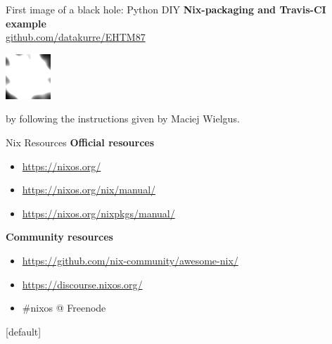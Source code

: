 \documentclass[12pt,aspectratio=169]{beamer}
\begin{document}

\begin{frame}[fragile]{First image of a black hole: Python DIY }
\textbf{Nix-packaging and Travis-CI example}\\
\href{https://github.com/datakurre/EHTM87/}{github.com/datakurre/EHTM87}
\par
\includegraphics[width=0.20\paperwidth]{images/M87.png}
\par
by following the instructions given by Maciej Wielgus.
\end{frame}


\begin{frame}{Nix Resources}
  \textbf{Official resources}
  \begin{itemize}
    \item \href{https://nixos.org/}{https://nixos.org/}
    \item \href{https://nixos.org/nix/manual/}{https://nixos.org/nix/manual/}
    \item \href{https://nixos.org/nixpkgs/manual/}{https://nixos.org/nixpkgs/manual/}
  \end{itemize}
  \textbf{Community resources}
  \begin{itemize}
    \item \href{https://github.com/nix-community/awesome-nix/}{https://github.com/nix-community/awesome-nix/}
    \item \href{https://discourse.nixos.org/}{https://discourse.nixos.org/}
    \item \#nixos @ Freenode
  \end{itemize}
\end{frame}


[default]
\end{document}
